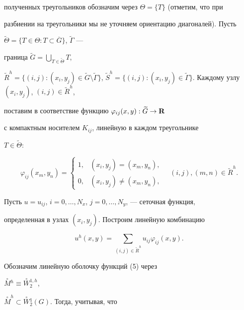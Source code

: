 полученных треугольников обозначим через $\Theta=\{T\}$ (отметим, что при


разбиении на треугольники мы не уточняем ориентацию диагоналей). Пусть


$\widetilde\Theta=\{T\in\Theta:T\subset\overline G\}$, $\widetilde\Gamma$ ---


граница $\widetilde G=\bigcup\limits_{T\in\widetilde\Theta}T$,


$\widetilde R^h=\{(i,j):(x_i,y_j)\in\widetilde


G\setminus\widetilde\Gamma\}$, $\widetilde S^h=\{(i,j):(x_i,y_j)\in


\widetilde\Gamma\}$. Каждому узлу $(x_i,y_j)$, $(i,j)\in\widetilde R^h$,


поставим в соответствие функцию $\varphi_{ij}(x,y):\widetilde G\to {\bold R}$


с компактным носителем $K_{ij}$, линейную в каждом треугольнике


$T\in\widetilde\Theta$:


$$


\varphi_{ij}(x_m,y_n)=


\begin{cases}


1, & (x_i,y_j)=(x_m,y_n), \\


0, & (x_i,y_j)\ne(x_m,y_n),


\end{cases}


\quad (i,j),(m,n)\in \widetilde R^h.


$$





Пусть $u=u_{ij}$, $i=0,\dotsc,N_x$, $j=0,\dotsc,N_y$, --- сеточная функция,


определенная в узлах $(x_i,y_j)$. Построим линейную комбинацию


\begin{equation}


u^h(x,y)=\sum_{(i,j)\in\widetilde R^h}u_{ij}\varphi_{ij}(x,y).


\end{equation}


Обозначим линейную оболочку функций (5) через


$\overset{\circ}{M}{}^h\equiv


\overset{\circ}{W}{}_2^{1,h}$,


$\overset{\circ}{M}^h\subset


\overset{\circ}{W}{}_2^1(G)$. Тогда, учитывая, что


